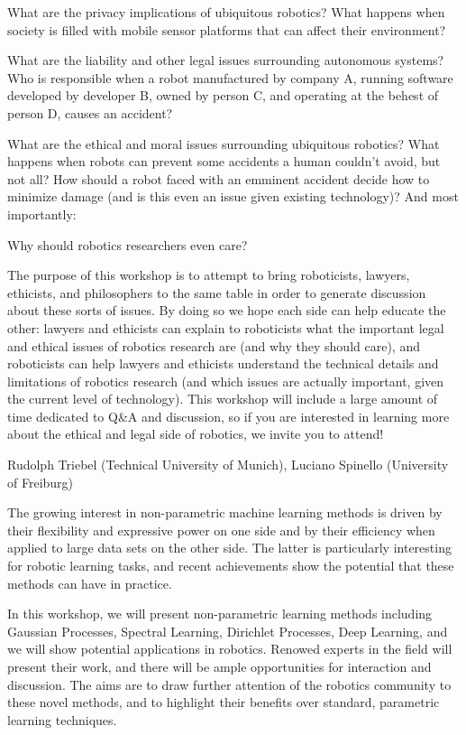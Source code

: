 \begin{spacing}{1.0}
{What are the privacy implications of ubiquitous robotics? What happens when society is filled with mobile sensor platforms that can affect their environment?

What are the liability and other legal issues surrounding autonomous systems? Who is responsible when a robot manufactured by company A, running software developed by developer B, owned by person C, and operating at the behest of person D, causes an accident?

What are the ethical and moral issues surrounding ubiquitous robotics? What happens when robots can prevent some accidents a human couldn't avoid, but not all? How should a robot faced with an emminent accident decide how to minimize damage (and is this even an issue given existing technology)? And most importantly:

Why should robotics researchers even care?

The purpose of this workshop is to attempt to bring roboticists, lawyers, ethicists, and philosophers to the same table in order to generate discussion about these sorts of issues. By doing so we hope each side can help educate the other: lawyers and ethicists can explain to roboticists what the important legal and ethical issues of robotics research are (and why they should care), and roboticists can help lawyers and ethicists understand the technical details and limitations of robotics research (and which issues are actually important, given the current level of technology). This workshop will include a large amount of time dedicated to Q\&A and discussion, so if you are interested in learning more about the ethical and legal side of robotics, we invite you to attend!
}


{Rudolph Triebel (Technical University of Munich), Luciano Spinello (University of Freiburg)}
{
The growing interest in non-parametric machine learning methods is driven by their flexibility and expressive power on one side and by their efficiency when applied to large data sets on the other side. The latter is particularly interesting for robotic learning tasks, and recent achievements show the potential that these methods can have in practice. 

In this workshop, we will present non-parametric learning methods including Gaussian Processes, Spectral Learning, Dirichlet Processes, Deep Learning, and we will show potential applications in robotics. 
Renowed experts in the field will present their work, and there will be ample opportunities for interaction and discussion. The aims are to draw further attention of the robotics community to these novel methods, and to highlight their benefits over standard, parametric learning techniques.
}



\end{spacing}
